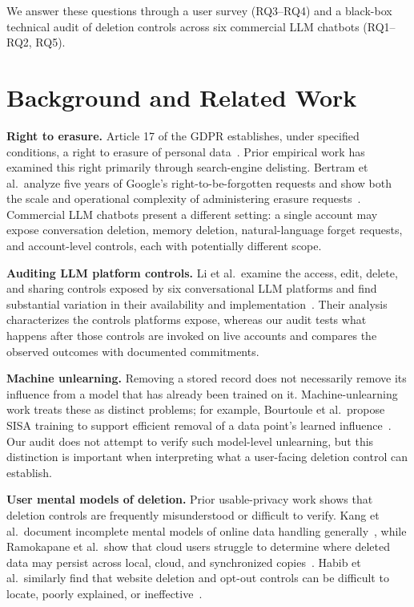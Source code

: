 \documentclass[conference,compsoc]{IEEEtran}
\begin{document}
We answer these questions through a user survey (RQ3--RQ4) and a
black-box technical audit of deletion controls across six commercial LLM
chatbots (RQ1--RQ2, RQ5).


\section{Background and Related Work}
\label{sec:background}

\textbf{Right to erasure.} Article 17 of the GDPR establishes, under
specified conditions, a right to erasure of personal data~\cite{gdpr2016}.
Prior empirical work has examined this right primarily through search-engine
delisting. Bertram et al.\ analyze five years of Google's right-to-be-forgotten
requests and show both the scale and operational complexity of administering
erasure requests~\cite{bertram2019five}. Commercial LLM chatbots present a
different setting: a single account may expose conversation deletion, memory
deletion, natural-language forget requests, and account-level controls, each
with potentially different scope.

\textbf{Auditing LLM platform controls.} Li et al.\ examine the
access, edit, delete, and sharing controls exposed by six conversational LLM
platforms and find substantial variation in their availability and
implementation~\cite{li2026privacy}. Their analysis characterizes the controls
platforms expose, whereas our audit tests what happens after those controls
are invoked on live accounts and compares the observed outcomes with
documented commitments.

\textbf{Machine unlearning.} Removing a stored record does not necessarily
remove its influence from a model that has already been trained on it.
Machine-unlearning work treats these as distinct problems; for example,
Bourtoule et al.\ propose SISA training to support efficient removal of a
data point's learned influence~\cite{bourtoule2021machine}. Our audit does
not attempt to verify such model-level unlearning, but this distinction is
important when interpreting what a user-facing deletion control can establish.

\textbf{User mental models of deletion.} Prior usable-privacy work shows
that deletion controls are frequently misunderstood or difficult to verify.
Kang et al.\ document incomplete mental models of online data handling
generally~\cite{kang2015mydata}, while Ramokapane et al.\ show that cloud
users struggle to determine where deleted data may persist across local,
cloud, and synchronized copies~\cite{ramokapane2017stupid}. Habib et al.\
similarly find that website deletion and opt-out controls can be difficult to
locate, poorly explained, or ineffective~\cite{habib2019empirical}.
\end{document}
